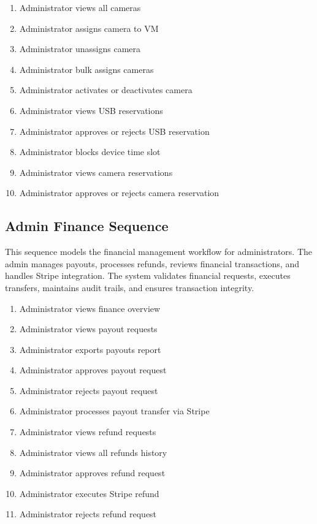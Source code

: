 \begin{enumerate}[topsep=0pt,itemsep=1pt,parsep=0pt,partopsep=0pt]
    \item Administrator views all cameras
    \item Administrator assigns camera to VM
    \item Administrator unassigns camera
    \item Administrator bulk assigns cameras
    \item Administrator activates or deactivates camera
    \item Administrator views USB reservations
    \item Administrator approves or rejects USB reservation
    \item Administrator blocks device time slot
    \item Administrator views camera reservations
    \item Administrator approves or rejects camera reservation
\end{enumerate}


\subsection{Admin Finance Sequence}
This sequence models the financial management workflow for administrators. The
admin manages payouts, processes refunds, reviews financial transactions, and
handles Stripe integration. The system validates financial requests, executes
transfers, maintains audit trails, and ensures transaction integrity.

\begin{enumerate}[topsep=0pt,itemsep=1pt,parsep=0pt,partopsep=0pt]
    \item Administrator views finance overview
    \item Administrator views payout requests
    \item Administrator exports payouts report
    \item Administrator approves payout request
    \item Administrator rejects payout request
    \item Administrator processes payout transfer via Stripe
    \item Administrator views refund requests
    \item Administrator views all refunds history
    \item Administrator approves refund request
    \item Administrator executes Stripe refund
    \item Administrator rejects refund request
\end{enumerate}

